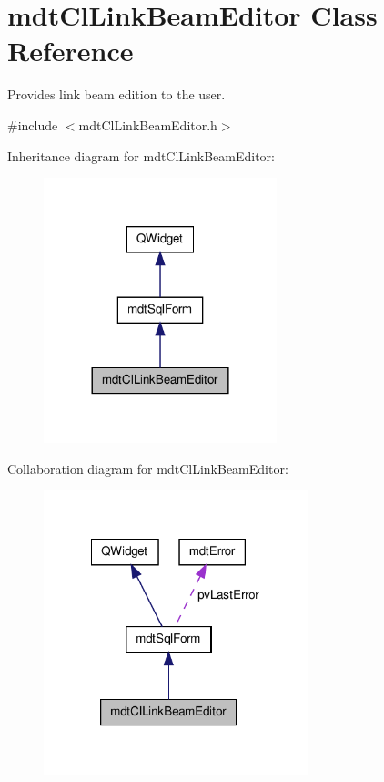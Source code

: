 \hypertarget{classmdt_cl_link_beam_editor}{\section{mdt\-Cl\-Link\-Beam\-Editor Class Reference}
\label{classmdt_cl_link_beam_editor}
}


Provides link beam edition to the user.  




{\ttfamily \#include $<$mdt\-Cl\-Link\-Beam\-Editor.\-h$>$}



Inheritance diagram for mdt\-Cl\-Link\-Beam\-Editor\-:
\nopagebreak
\begin{figure}[H]
\begin{center}
\leavevmode
\includegraphics[width=192pt]{classmdt_cl_link_beam_editor__inherit__graph}
\end{center}
\end{figure}


Collaboration diagram for mdt\-Cl\-Link\-Beam\-Editor\-:
\nopagebreak
\begin{figure}[H]
\begin{center}
\leavevmode
\includegraphics[width=218pt]{classmdt_cl_link_beam_editor__coll__graph}
\end{center}
\end{figure}
